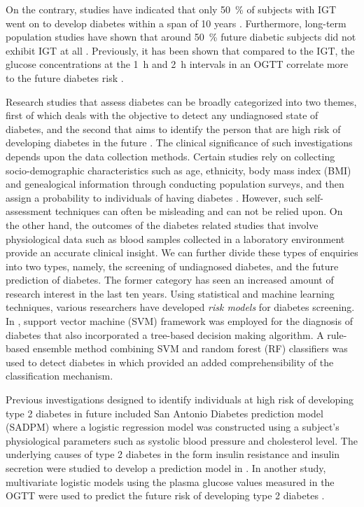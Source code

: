 \documentclass[journal,comsoc]{IEEEtran}
\renewcommand{\^}{\hat}  %
\begin{document}
On the contrary, studies have indicated that only \SI{50}{\percent} of subjects with IGT went on to develop diabetes within a span of \num{10} years \cite{shaw_impaired_1999, writing_committee_impaired_2002}. Furthermore, long-term population studies have shown that around \SI{50}{\percent} future diabetic subjects did not exhibit IGT at all \cite{abdul-ghani_what_2007}. Previously, it has been shown that compared to the IGT, the glucose concentrations at the \SI{1}{\hour} and \SI{2}{\hour} intervals in an OGTT correlate more to the future diabetes risk \cite{abdul2009fasting,abdul-ghani_shape_2010,abdul-ghani_plasma_2009}.

Research studies that assess diabetes can be broadly categorized into two themes, first of which deals with the objective to detect any undiagnosed state of diabetes, and the second that aims to identify the person that are high risk of developing diabetes in the future \cite{noble2011risk}. The clinical significance of such investigations depends upon the data collection methods. Certain studies rely on collecting socio-demographic characteristics such as age, ethnicity, body mass index (BMI) and genealogical information through conducting population surveys, and then assign a probability to individuals of having diabetes \cite{Heikes1040,Glumer727}.  However, such self-assessment techniques can often be misleading and can not be relied upon. On the other hand, the outcomes of the diabetes related studies that involve physiological data such as blood samples collected in a laboratory environment provide an accurate clinical insight. We can further divide these types of enquiries into two types, namely, the screening  of undiagnosed diabetes, and the future prediction of diabetes. The former category has seen an increased amount of research interest in the last ten years. Using statistical and machine learning techniques, various researchers have developed \emph{risk models} for diabetes screening. In \cite{barakat_intelligible_2010}, support vector machine (SVM) framework was employed for the diagnosis of diabetes that also incorporated a tree-based decision making algorithm. A rule-based ensemble method combining SVM and random forest (RF) classifiers was used to detect diabetes in \cite{han_rule_2015} which provided an added comprehensibility of the classification mechanism.

Previous investigations designed to identify individuals at high risk of developing type 2 diabetes in future included San Antonio Diabetes prediction model (SADPM) \cite{stern2002identification} where a logistic regression model was constructed using a subject's physiological parameters such as systolic blood pressure and cholesterol level. The underlying causes of type 2 diabetes in the form insulin resistance and insulin secretion were studied to develop a prediction model in \cite{abdul-ghani_what_2007}. In another study,  multivariate logistic models using the plasma glucose values measured in the OGTT were used to predict the future risk of developing type 2 diabetes \cite{abdul-ghani_two-step_2011,abdul2009fasting}.
\end{document}

